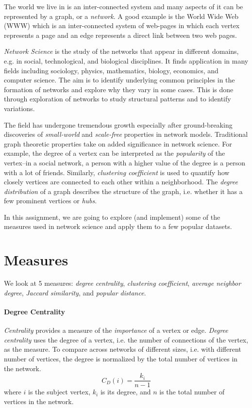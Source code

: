 \documentclass[addpoints]{exam}
\begin{document}
The world we live in is an inter-connected system and many aspects of it can be represented by a graph, or a \textit{network}. A good example is the World Wide Web (WWW) which is an inter-connected system of web-pages in which each vertex represents a page and an edge represents a direct link between two web pages.

\textit{Network Science} is the study of the networks that appear in different domains, e.g. in social, technological, and biological disciplines. It finds application in many fields including sociology, physics, mathematics, biology, economics, and computer science. The aim is to identify underlying common principles in the formation of networks and explore why they vary in some cases. This is done through exploration of networks to study structural patterns and to identify variations.

The field has undergone tremendous growth especially after ground-breaking discoveries of \textit{small-world} and \textit{scale-free} properties in network models. Traditional graph theoretic properties take on added significance in network science. For example, the degree of a vertex can be interpreted as the \textit{popularity} of the vertex--in a social network, a person with a higher value of the degree is a person with a lot of friends.  Similarly, \textit{clustering coefficient} is used to quantify how closely vertices are connected to each other within a neighborhood. The \textit{degree distribution} of a graph describes the structure of the graph, i.e. whether it has a few prominent vertices or \textit{hubs}.

In this assignment, we are going to explore (and implement) some of the measures used in network science and apply them to a few popular datasets.

\section{Measures}

We look at 5 measures: \textit{degree centrality}, \textit{clustering coefficient}, \textit{average neighbor degree}, \textit{Jaccard similarity}, and \textit{popular distance}.

\paragraph{Degree Centrality}
\textit{Centrality} provides a measure of the \textit{importance} of a vertex or edge. \textit{Degree centrality} uses the degree of a vertex, i.e. the number of connections of the vertex, as the measure. To compare across networks of different sizes, i.e. with different number of vertices, the degree is normalized by the total number of vertices in the network.
\[
  C_D(i) = \frac{k_i}{n-1}
\]
where $i$ is the subject vertex, $k_i$ is its degree, and $n$ is the total number of vertices in the network.
\end{document}
